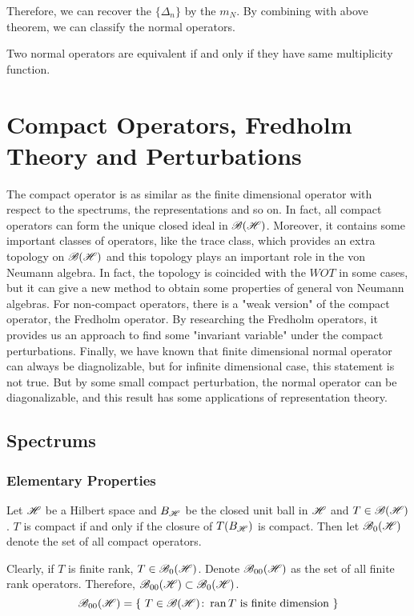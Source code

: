 \documentclass[a4paper,11pt]{report}
\begin{document}
Therefore, we can recover the $\{\Delta_n\}$ by the $m_N$. By combining with above theorem, we can classify the normal operators.

\begin{thm}
	Two normal operators are equivalent if and only if they have same multiplicity function.
\end{thm}

\chapter{Compact Operators, Fredholm Theory and Perturbations}

The compact operator is as similar as the finite dimensional operator with respect to the spectrums, the representations and so on. In fact, all compact operators can form the unique closed ideal in $\mathscr{B(H)}$. Moreover, it contains some important classes of operators, like the trace class, which provides an extra topology on $\mathscr{B(H)}$ and this topology plays an important role in the von Neumann algebra. In fact, the topology is coincided with the $WOT$ in some cases, but it can give a new method to obtain some properties of general von Neumann algebras. For non-compact operators, there is a "weak version" of the compact operator, the Fredholm operator. By researching the Fredholm operators, it provides us an approach to find some "invariant variable" under the compact perturbations. Finally, we have known that finite dimensional normal operator can always be diagnolizable, but for infinite dimensional case, this statement is not true. But by some small compact perturbation, the normal operator can be diagonalizable, and this result has some applications of representation theory. 

\section{Spectrums}

\subsection{Elementary Properties}

\begin{defn}
	Let $\mathscr{H}$ be a Hilbert space and $B_{\mathscr{H}}$ be the closed unit ball in $\mathscr{H}$ and $T \in \mathscr{B(H)}$. $T$ is compact if and only if the closure of $T(B_{\mathscr{H}})$ is compact. Then let $\mathscr{B}_{0}\mathscr{(H)}$ denote the set of all compact operators.
\end{defn}
\begin{rem}
	Clearly, if $T$ is finite rank, $T \in \mathscr{B}_{0}\mathscr{(H)}$. Denote $\mathscr{B}_{00}\mathscr{(H)}$ as the set of all finite rank operators. Therefore, $\mathscr{B}_{00}\mathscr{(H)} \subset \mathscr{B}_{0}\mathscr{(H)}$.
	\begin{equation*}
		\mathscr{B}_{00}\mathscr{(H)} = \{~T \in \mathscr{B(H)} \colon \operatorname{ran}{T} \text{ is finite dimension}~\}
	\end{equation*}
\end{rem}
\end{document}
